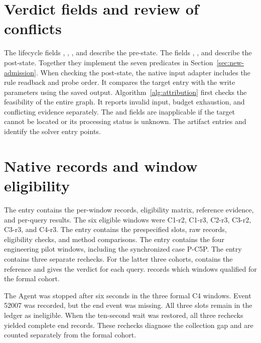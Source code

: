\clearpage
\appendix
\setcounter{figure}{0}
\renewcommand{\thefigure}{S\arabic{figure}}
\renewcommand{\theHfigure}{supp.\arabic{figure}}
\providecommand{\theHfigurewid}{supp.\arabic{figurewid}}
\section{Verdict fields and review of conflicts}\label{verdict-fields-and-review-of-conflicts}

The lifecycle fields , , , and  describe the pre-state. The fields , , and  describe the post-state. Together they implement the seven predicates in Section~\ref{sec:new-admission}. When checking the post-state, the native input adapter includes the rule readback and probe order. It compares the target entry with the write parameters using the saved output. Algorithm~\ref{alg:attribution} first checks the feasibility of the entire graph. It reports invalid input, budget exhaustion, and conflicting evidence separately. The  and  fields are inapplicable if the target cannot be located or its processing status is unknown. The artifact entries  and  identify the solver entry points.

\section{Native records and window eligibility}\label{native-records-and-window-eligibility}

The  entry contains the per-window records, eligibility matrix, reference evidence, and per-query results. The six eligible windows were C1-r2, C1-r3, C2-r3, C3-r2, C3-r3, and C4-r3. The  entry contains the prespecified slots, raw records, eligibility checks, and method comparisons. The  entry contains the four engineering pilot windows, including the synchronized case P-C5P. The  entry contains three separate rechecks. For the latter three cohorts,  contains the reference and  gives the verdict for each query.  records which windows qualified for the formal cohort.

The Agent was stopped after six seconds in the three formal C4 windows. Event 52007 was recorded, but the end event was missing. All three slots remain in the ledger as ineligible. When the ten-second wait was restored, all three rechecks yielded complete end records. These rechecks diagnose the collection gap and are counted separately from the formal cohort.

